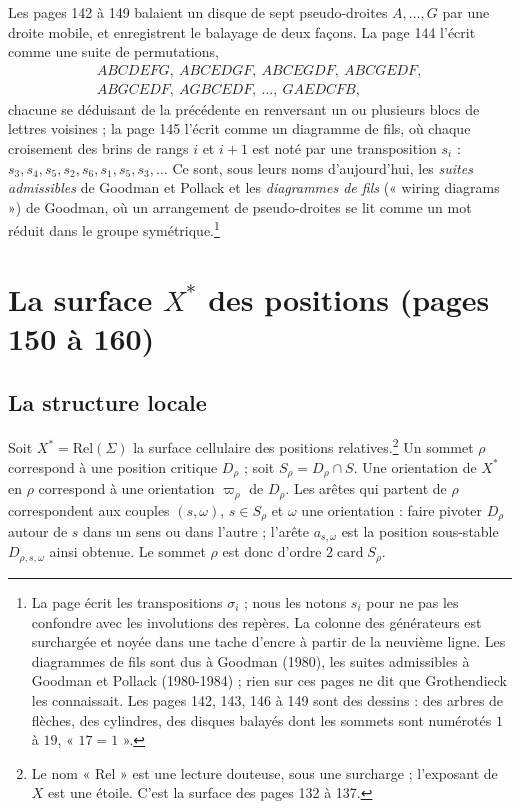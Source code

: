 \documentclass[11pt,a4paper]{article}
\begin{document}
Les pages 142 à 149 balaient un disque de sept pseudo-droites $A, \ldots, G$ par
une droite mobile, et enregistrent le balayage de deux façons. La page 144
l'écrit comme une suite de permutations,
\begin{gather*}
ABCDEFG,\ ABCEDGF,\ ABCEGDF,\ ABCGEDF, \\
ABGCEDF,\ AGBCEDF,\ \ldots,\ GAEDCFB,
\end{gather*}
chacune se déduisant de la précédente en renversant un ou plusieurs blocs de
lettres voisines ; la page 145 l'écrit comme un diagramme de fils, où chaque
croisement des brins de rangs $i$ et $i+1$ est noté par une transposition
$s_i$ : $s_3, s_4, s_5, s_2, s_6, s_1, s_5, s_3, \ldots$ Ce sont, sous leurs noms
d'aujourd'hui, les \emph{suites admissibles} de Goodman et Pollack et les
\emph{diagrammes de fils} (« wiring diagrams ») de Goodman, où un arrangement de
pseudo-droites se lit comme un mot réduit dans le groupe
symétrique.\footnote{La page écrit les transpositions $\sigma_i$ ; nous les
notons $s_i$ pour ne pas les confondre avec les involutions des repères. La
colonne des générateurs est surchargée et noyée dans une tache d'encre à
partir de la neuvième ligne. Les diagrammes de fils sont dus à Goodman (1980),
les suites admissibles à Goodman et Pollack (1980-1984) ; rien sur ces pages ne
dit que Grothendieck les connaissait. Les pages 142, 143, 146 à 149 sont des
dessins : des arbres de flèches, des cylindres, des disques balayés dont les
sommets sont numérotés $1$ à $19$, « $17 = 1$ ».}

\section*{La surface $X^{*}$ des positions (pages 150 à 160)}

\subsection*{La structure locale}

Soit $X^{*} = \mathrm{Rel}(\Sigma)$ la surface cellulaire des positions
relatives.\footnote{Le nom « Rel » est une lecture douteuse, sous une
surcharge ; l'exposant de $X$ est une étoile. C'est la surface des pages 132 à 137.} Un sommet $\rho$ correspond à une position critique
$D_\rho$ ; soit $S_\rho = D_\rho \cap S$. Une orientation de $X^{*}$ en $\rho$
correspond à une orientation $\varpi_\rho$ de $D_\rho$. Les arêtes qui partent de
$\rho$ correspondent aux couples $(s, \omega)$, $s \in S_\rho$ et $\omega$ une
orientation : faire pivoter $D_\rho$ autour de $s$ dans un sens ou dans l'autre ;
l'arête $a_{s,\omega}$ est la position sous-stable $D_{\rho,s,\omega}$ ainsi
obtenue. Le sommet $\rho$ est donc d'ordre $2\operatorname{card} S_\rho$.
\end{document}
